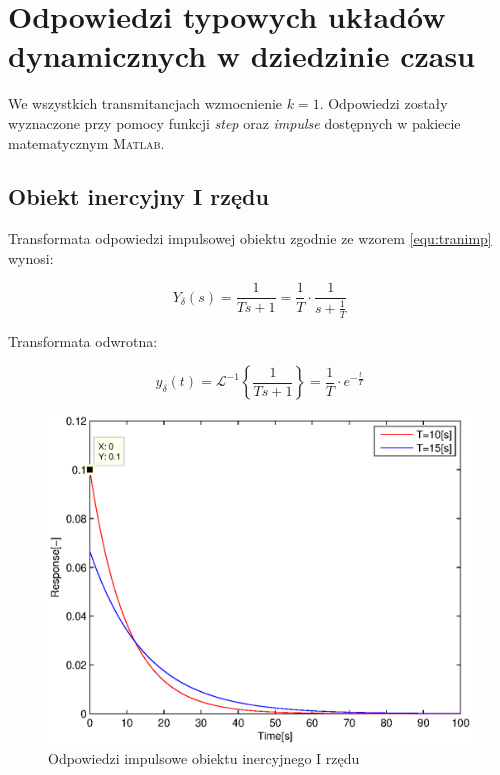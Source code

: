 \documentclass[12pt]{article}
\begin{document}
\newpage

\section{Odpowiedzi typowych układów dynamicznych w dziedzinie czasu}

We wszystkich transmitancjach wzmocnienie $k=1$. Odpowiedzi zostały wyznaczone
przy pomocy funkcji \textit{step} oraz \textit{impulse} dostępnych w pakiecie
matematycznym \textsc{Matlab}.

\subsection{Obiekt inercyjny I rzędu}

Transformata odpowiedzi impulsowej obiektu zgodnie ze wzorem \eqref{equ:tranimp}
wynosi:

\begin{equation*}
	Y_{\delta}(s)=\frac{1}{Ts+1}=\frac{1}{T}\cdot \frac{1}{s+\frac{1}{T}}
\end{equation*}

Transformata odwrotna:

\begin{equation*}
	y_{\delta}(t)=\mathcal{L}^{-1}\left\{\frac{1}{Ts+1}\right\}=
	\frac{1}{T}\cdot e^{-\frac{t}{T}}
\end{equation*}

\begin{figure}[!htb]
	\begin{center}
		\includegraphics[width=14cm]{../res/img/imp1.eps}
	\end{center}
	\caption{Odpowiedzi impulsowe obiektu inercyjnego I rzędu}
\end{figure}
\end{document}
